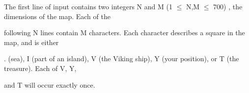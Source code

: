 The first line of input contains two integers N and M (1 $\le$ N,M $\le$ 700) , the dimensions of the map. Each of the

following N lines contain M characters. Each character describes a square in the map, and is either

. (sea), I (part of an island), V (the Viking ship), Y (your position), or T (the treasure). Each of V, Y,

and T will occur exactly once.

\